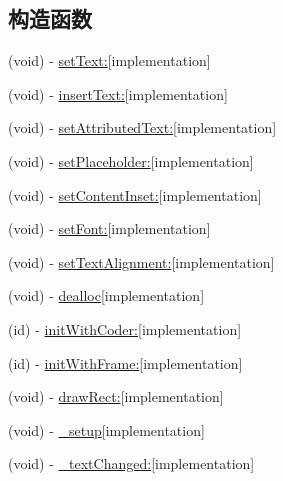 \subsection*{构造函数}
\begin{DoxyCompactItemize}
\item 
(void) -\/ \hyperlink{interface_m_a_r_u_i_text_view_a9901a767f3932486811103b70dc07def}{set\+Text\+:}{\ttfamily  \mbox{[}implementation\mbox{]}}
\item 
(void) -\/ \hyperlink{interface_m_a_r_u_i_text_view_a21f8570c0213161da4e9fe8ef6cf4cdb}{insert\+Text\+:}{\ttfamily  \mbox{[}implementation\mbox{]}}
\item 
(void) -\/ \hyperlink{interface_m_a_r_u_i_text_view_a322a33149929cda551bd7c0553bc3dd2}{set\+Attributed\+Text\+:}{\ttfamily  \mbox{[}implementation\mbox{]}}
\item 
(void) -\/ \hyperlink{interface_m_a_r_u_i_text_view_a3ccfa4cd3111b62cd34dfbecdc97dd89}{set\+Placeholder\+:}{\ttfamily  \mbox{[}implementation\mbox{]}}
\item 
(void) -\/ \hyperlink{interface_m_a_r_u_i_text_view_a4855664e3c614dae073a5341f7121cad}{set\+Content\+Inset\+:}{\ttfamily  \mbox{[}implementation\mbox{]}}
\item 
(void) -\/ \hyperlink{interface_m_a_r_u_i_text_view_a33644ffa1d39ca59f1a95f1f2c635547}{set\+Font\+:}{\ttfamily  \mbox{[}implementation\mbox{]}}
\item 
(void) -\/ \hyperlink{interface_m_a_r_u_i_text_view_a58a8bc16c41fcefd7c5c5b9477df5522}{set\+Text\+Alignment\+:}{\ttfamily  \mbox{[}implementation\mbox{]}}
\item 
(void) -\/ \hyperlink{interface_m_a_r_u_i_text_view_a31423893b6304d3e8823663459222c81}{dealloc}{\ttfamily  \mbox{[}implementation\mbox{]}}
\item 
(id) -\/ \hyperlink{interface_m_a_r_u_i_text_view_a2fbcefb7713dcee5928ab1dae4716229}{init\+With\+Coder\+:}{\ttfamily  \mbox{[}implementation\mbox{]}}
\item 
(id) -\/ \hyperlink{interface_m_a_r_u_i_text_view_a610ef0613d4230267ebd0c54beb07c2f}{init\+With\+Frame\+:}{\ttfamily  \mbox{[}implementation\mbox{]}}
\item 
(void) -\/ \hyperlink{interface_m_a_r_u_i_text_view_a2bd2c389d9c87b288129d59154723bee}{draw\+Rect\+:}{\ttfamily  \mbox{[}implementation\mbox{]}}
\item 
(void) -\/ \hyperlink{interface_m_a_r_u_i_text_view_ab776d800a2938d34c31b7b6a3e13e563}{\+\_\+setup}{\ttfamily  \mbox{[}implementation\mbox{]}}
\item 
(void) -\/ \hyperlink{interface_m_a_r_u_i_text_view_ab43f82db634ee534df0a2b8c87d66944}{\+\_\+text\+Changed\+:}{\ttfamily  \mbox{[}implementation\mbox{]}}
\end{DoxyCompactItemize}
